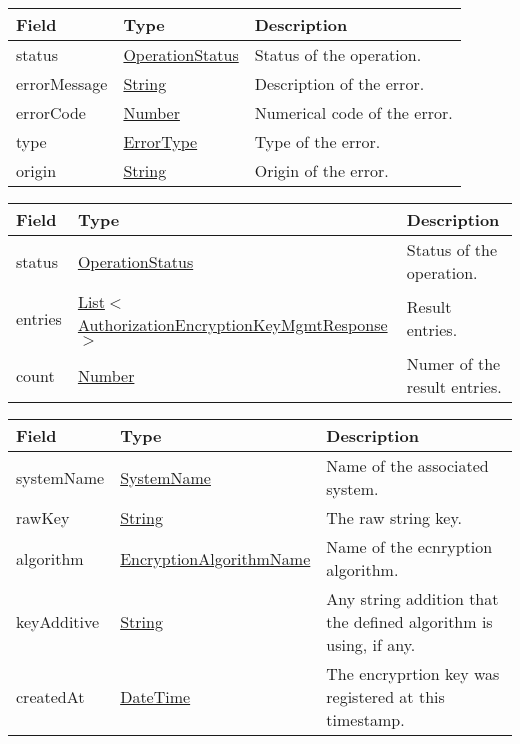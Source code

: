 \documentclass[a4paper]{arrowhead}
\newcommand{\pref}[1]{{\textcolor{ArrowheadGrey}{\hyperref[sec:model:primitives:#1]{#1}}}}
\begin{document}

\begin{table}[ht!]
\begin{tabularx}{\textwidth}{| p{4.25cm} | p{3.5cm} | X |} \hline
\rowcolor{gray!33} Field & Type      & Description \\ \hline
status & \pref{OperationStatus} & Status of the operation. \\ \hline
errorMessage & \pref{String} & Description of the error. \\ \hline
errorCode &\pref{Number}  & Numerical code of the error. \\ \hline
type & \pref{ErrorType} & Type of the error. \\ \hline
origin & \pref{String} & Origin of the error. \\ \hline
\end{tabularx}
\end{table}


\begin{table}[ht!]
\begin{tabularx}{\textwidth}{| p{2cm} | p{7.8cm} | X |} \hline
\rowcolor{gray!33} Field & Type & Description \\ \hline
status & \pref{OperationStatus} & Status of the operation. \\ \hline
entries & \pref{List}$<$\hyperref[sec:model:AuthorizationEncryptionKeyMgmtResponse]{AuthorizationEncryptionKeyMgmtResponse}$>$ & Result entries. \\ \hline
count & \pref{Number} & Numer of the result entries. \\ \hline
\end{tabularx}
\end{table}

\clearpage


\begin{table}[ht!]
\begin{tabularx}{\textwidth}{| p{4.25cm} | p{4.5cm} | X |} \hline
\rowcolor{gray!33} Field & Type & Description \\ \hline
systemName & \pref{SystemName} & Name of the associated system. \\ \hline
rawKey & \pref{String} & The raw string key. \\ \hline
algorithm & \pref{EncryptionAlgorithmName} & Name of the ecnryption algorithm. \\ \hline
keyAdditive & \pref{String} & Any string addition that the defined algorithm is using, if any. \\ \hline
createdAt & \pref{DateTime} & The encryprtion key was registered at this timestamp. \\ \hline
\end{tabularx}
\end{table}
\end{document}
